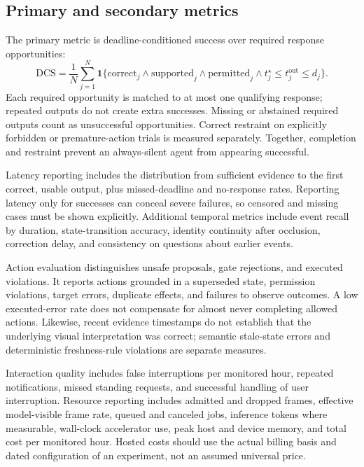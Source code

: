 \documentclass[11pt,letterpaper]{article}
\newcommand{\ind}{\mathbf{1}}
\begin{document}
\subsection{Primary and secondary metrics}
The primary metric is deadline-conditioned success over required response opportunities:
\begin{equation}
 \mathrm{DCS}=\frac{1}{N}\sum_{j=1}^{N}
 \ind\{\mathrm{correct}_j\land\mathrm{supported}_j\land\mathrm{permitted}_j
       \land t_j^\star\leq t_j^{\mathrm{out}}\leq d_j\}.
 \label{eq:dcs}
\end{equation}
Each required opportunity is matched to at most one qualifying response; repeated outputs do not create extra successes. Missing or abstained required outputs count as unsuccessful opportunities. Correct restraint on explicitly forbidden or premature-action trials is measured separately. Together, completion and restraint prevent an always-silent agent from appearing successful.

Latency reporting includes the distribution from sufficient evidence to the first correct, usable output, plus missed-deadline and no-response rates. Reporting latency only for successes can conceal severe failures, so censored and missing cases must be shown explicitly. Additional temporal metrics include event recall by duration, state-transition accuracy, identity continuity after occlusion, correction delay, and consistency on questions about earlier events.

Action evaluation distinguishes unsafe proposals, gate rejections, and executed violations. It reports actions grounded in a superseded state, permission violations, target errors, duplicate effects, and failures to observe outcomes. A low executed-error rate does not compensate for almost never completing allowed actions. Likewise, recent evidence timestamps do not establish that the underlying visual interpretation was correct; semantic stale-state errors and deterministic freshness-rule violations are separate measures.

Interaction quality includes false interruptions per monitored hour, repeated notifications, missed standing requests, and successful handling of user interruption. Resource reporting includes admitted and dropped frames, effective model-visible frame rate, queued and canceled jobs, inference tokens where measurable, wall-clock accelerator use, peak host and device memory, and total cost per monitored hour. Hosted costs should use the actual billing basis and dated configuration of an experiment, not an assumed universal price.
\end{document}
